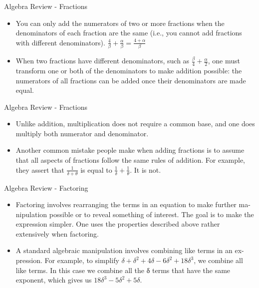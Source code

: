 \documentclass[
  ignorenonframetext,
]{beamer}
\begin{document}
\begin{frame}{Algebra Review - Fractions}
\protect\hypertarget{algebra-review---fractions}{}

\begin{itemize}
\item
  You can only add the numerators of two or more fractions when the
  denominators of each fraction are the same (i.e., you cannot add
  fractions with different denominators).
  \(\frac{4}{\beta} + \frac{\alpha}{\beta} = \frac{4+ \alpha}{\beta}\)
\item
  When two fractions have different denominators, such as
  \(\frac{\beta}{4} + \frac{\alpha}{2}\), one must transform one or both
  of the denominators to make addition possible: the numerators of all
  fractions can be added once their denominators are made equal.
\end{itemize}

\end{frame}

\begin{frame}{Algebra Review - Fractions}
\protect\hypertarget{algebra-review---fractions-1}{}

\begin{itemize}
\item
  Unlike addition, multiplication does not require a common base, and
  one does multiply both numerator and denominator.
\item
  Another common mistake people make when adding fractions is to assume
  that all aspects of fractions follow the same rules of addition. For
  example, they assert that \(\frac{1}{\delta + \theta}\) is equal to
  \(\frac{1}{\delta} + \frac{1}{\theta}\). It is not.
\end{itemize}

\end{frame}

\begin{frame}{Algebra Review - Factoring}
\protect\hypertarget{algebra-review---factoring}{}

\begin{itemize}
\item
  Factoring involves rearranging the terms in an equation to make
  further ma- nipulation possible or to reveal something of interest.
  The goal is to make the expression simpler. One uses the properties
  described above rather extensively when factoring.
\item
  A standard algebraic manipulation involves combining like terms in an
  ex- pression. For example, to simplify
  \(δ + δ^{2} + 4δ − 6δ^{2} + 18δ^{3}\), we combine all like terms. In
  this case we combine all the δ terms that have the same exponent,
  which gives us \(18δ^{3} − 5δ^{2} + 5δ\).
\end{itemize}

\end{frame}
\end{document}
